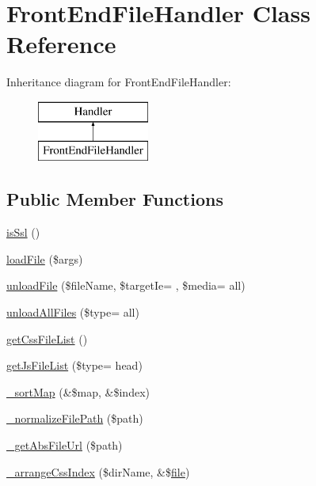 \hypertarget{classFrontEndFileHandler}{}\section{Front\+End\+File\+Handler Class Reference}
\label{classFrontEndFileHandler}
Inheritance diagram for Front\+End\+File\+Handler\+:\begin{figure}[H]
\begin{center}
\leavevmode
\includegraphics[height=2.000000cm]{classFrontEndFileHandler}
\end{center}
\end{figure}
\subsection*{Public Member Functions}
\begin{DoxyCompactItemize}
\item 
\hyperlink{classFrontEndFileHandler_a2bd70c621572f784c4e563d0dafa0fc2}{is\+Ssl} ()
\item 
\hyperlink{classFrontEndFileHandler_aeb802ae7b7b315da73ec3be224ce9e9f}{load\+File} (\$args)
\item 
\hyperlink{classFrontEndFileHandler_ad55bc752b0d140bbfefaaa30057db3d2}{unload\+File} (\$file\+Name, \$target\+Ie= \textquotesingle{}\textquotesingle{}, \$media= \textquotesingle{}all\textquotesingle{})
\item 
\hyperlink{classFrontEndFileHandler_ad118128391da5bb33e4a7105152432bc}{unload\+All\+Files} (\$type= \textquotesingle{}all\textquotesingle{})
\item 
\hyperlink{classFrontEndFileHandler_a35cff5fb32625790d01e8839c73fd0fc}{get\+Css\+File\+List} ()
\item 
\hyperlink{classFrontEndFileHandler_ab6147b1dac393bc3838d433f3c46553f}{get\+Js\+File\+List} (\$type= \textquotesingle{}head\textquotesingle{})
\item 
\hyperlink{classFrontEndFileHandler_a3677abdd2a1a3a17fd1de9f58ffe27a5}{\+\_\+sort\+Map} (\&\$map, \&\$index)
\item 
\hyperlink{classFrontEndFileHandler_a4818293d9395dd1b4d62b8cabeb04603}{\+\_\+normalize\+File\+Path} (\$path)
\item 
\hyperlink{classFrontEndFileHandler_a0a76e82d6037ea9a862e1585b2e562df}{\+\_\+get\+Abs\+File\+Url} (\$path)
\item 
\hyperlink{classFrontEndFileHandler_aedfe6ba984a8e33de211ef23e83cd98e}{\+\_\+arrange\+Css\+Index} (\$dir\+Name, \&\$\hyperlink{classfile}{file})
\end{DoxyCompactItemize}
